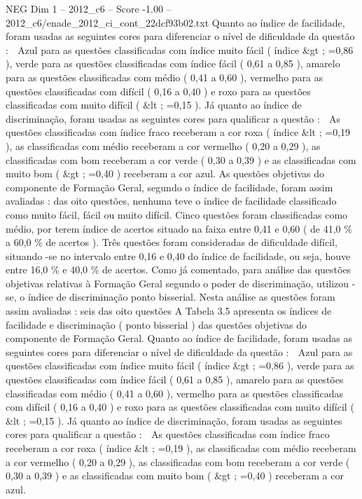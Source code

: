 \begin{textsample}{NEG Dim 1 – 2012\_c6 – Score -1.00 – 2012\_c6/enade\_2012\_ci\_cont\_22dcf93b02.txt}
Quanto ao índice de facilidade, foram usadas as seguintes cores para diferenciar o nível de dificuldade da questão :  Azul para as questões classificadas com índice muito fácil ( índice \&gt ; =0,86 ), verde para as questões classificadas com índice fácil ( 0,61 a 0,85 ), amarelo para as questões classificadas com médio ( 0,41 a 0,60 ), vermelho para as questões classificadas com difícil ( 0,16 a 0,40 ) e roxo para as questões classificadas com muito difícil ( \&lt ; =0,15 ).
Já quanto ao índice de discriminação, foram usadas as seguintes cores para qualificar a questão :  As questões classificadas com índice fraco receberam a cor roxa ( índice \&lt ; =0,19 ), as classificadas com médio receberam a cor vermelho ( 0,20 a 0,29 ), as classificadas com bom receberam a cor verde ( 0,30 a 0,39 ) e as classificadas com muito bom ( \&gt ; =0,40 ) receberam a cor azul.
As questões objetivas do componente de Formação Geral, segundo o índice de facilidade, foram assim avaliadas : das oito questões, nenhuma teve o índice de facilidade classificado como muito fácil, fácil ou muito difícil.
Cinco questões foram classificadas como médio, por terem índice de acertos situado na faixa entre 0,41 e 0,60 ( de 41,0 \% a 60,0 \% de acertos ).
Três questões foram consideradas de dificuldade difícil, situando -se no intervalo entre 0,16 e 0,40 do índice de facilidade, ou seja, houve entre 16,0 \% e 40,0 \% de acertos.
Como já comentado, para análise das questões objetivas relativas à Formação Geral segundo o poder de discriminação, utilizou -se, o índice de discriminação ponto bisserial.
Nesta análise as questões foram assim avaliadas : seis das oito questões A Tabela 3.5 apresenta os índices de facilidade e discriminação ( ponto bisserial ) das questões objetivas do componente de Formação Geral.
Quanto ao índice de facilidade, foram usadas as seguintes cores para diferenciar o nível de dificuldade da questão :  Azul para as questões classificadas com índice muito fácil ( índice \&gt ; =0,86 ), verde para as questões classificadas com índice fácil ( 0,61 a 0,85 ), amarelo para as questões classificadas com médio ( 0,41 a 0,60 ), vermelho para as questões classificadas com difícil ( 0,16 a 0,40 ) e roxo para as questões classificadas com muito difícil ( \&lt ; =0,15 ).
Já quanto ao índice de discriminação, foram usadas as seguintes cores para qualificar a questão :  As questões classificadas com índice fraco receberam a cor roxa ( índice \&lt ; =0,19 ), as classificadas com médio receberam a cor vermelho ( 0,20 a 0,29 ), as classificadas com bom receberam a cor verde ( 0,30 a 0,39 ) e as classificadas com muito bom ( \&gt ; =0,40 ) receberam a cor azul.

\end{textsample}
